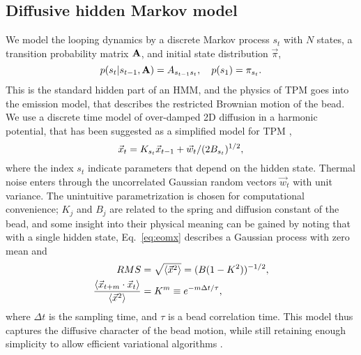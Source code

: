 \subsection{Diffusive hidden Markov model}
We model the looping dynamics by a discrete Markov process $s_t$ with
$N$ states, a transition probability matrix $\mathbf{A}$, and initial
state distribution $\vec{\pi}$,
\begin{equation}\label{eq:eoms}
  p(s_t|s_{t-1},\mathbf{A})=A_{s_{t-1}s_t},\quad p(s_1)=\pi_{s_t}.
\end{equation}
This is the standard hidden part of an HMM, and the physics of TPM
goes into the emission model, that describes the restricted Brownian
motion of the bead. We use a discrete time model of over-damped 2D
diffusion in a harmonic potential, that has been suggested as a
simplified model for TPM \cite{beausang2007b,lindner2013},
\begin{equation}\label{eq:eomx}
  \vec{x}_t=K_{s_t}\vec{x}_{t-1}+\vec{w}_t/(2B_{s_t})^{1/2},
\end{equation}
where the index $s_t$ indicate parameters that depend on the hidden
state.  Thermal noise enters through the uncorrelated Gaussian random
vectors $\vec{w}_t$ with unit variance. The unintuitive
parametrization is chosen for computational convenience; $K_j$ and
$B_j$ are related to the spring and diffusion constant of the bead,
and some insight into their physical meaning can be gained by noting
that with a single hidden state, Eq.~\ref{eq:eomx} describes a
Gaussian process with zero mean and
\begin{align}
RMS&=\sqrt{\left\langle \vec{x}^2\right\rangle}=(B(1-K^2))^{-1/2},\nonumber\\
\frac{\left\langle \vec{x}_{t+m}\cdot\vec{x}_t\right\rangle}{\left\langle \vec{x}^2\right\rangle}&
=K^m\equiv e^{-m\Delta t/\tau},\label{eq:1state}
\end{align}
where $\Delta t$ is the sampling time, and $\tau$ is a bead
correlation time.  This model thus captures the diffusive character of
the bead motion, while still retaining enough simplicity to allow
efficient variational algorithms
\cite{mackay1997,bishop2006}.

